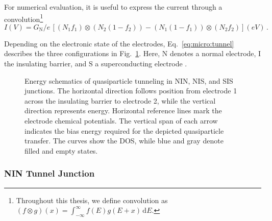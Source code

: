         For numerical evaluation, it is useful to express the current through a convolution\footnote{
            Throughout this thesis, we define convolution as $\left(f\otimes g\right)(x)=\int_{-\infty}^{\infty}f(E)g(E+x)\,\mathrm{d}E$.
            }
        \begin{equation}
            I(V)
            = G_\mathrm{N}/e\,
            \left[
                \left(N_1f_1\right)\otimes\left(N_2(1-f_2)\right)
                -
                \left(N_1(1-f_1)\right)\otimes\left(N_2f_2\right)
            \right](eV)\,.
            \label{eq:micro:tunnel-conv}
        \end{equation}

        Depending on the electronic state of the electrodes, Eq.~\eqref{eq:micro:tunnel} describes the three configurations in Fig.~\ref{fig:micro:tunnel-current}. Here, $\mathrm{N}$ denotes a normal electrode, I the insulating barrier, and $\mathrm{S}$ a superconducting electrode \cite{giaever_electron_1960,giaever_study_1961}.

        \begin{figure}[t]
            \centering
            \hfill
            \hfill
            \caption{
                Energy schematics of quasiparticle tunneling in NIN, NIS, and SIS junctions. The horizontal direction follows position from electrode 1 across the insulating barrier to electrode 2, while the vertical direction represents energy. Horizontal reference lines mark the electrode chemical potentials. The vertical span of each arrow indicates the bias energy required for the depicted quasiparticle transfer. The curves show the DOS, while blue and gray denote filled and empty states.
            }
            \label{fig:micro:tunnel-current}
        \end{figure}

        \subsubsection*{NIN Tunnel Junction}

